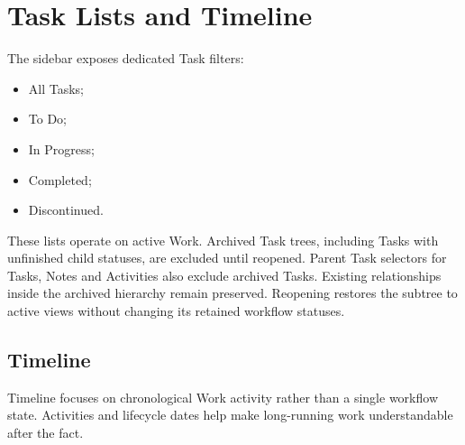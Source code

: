 \documentclass{testudomanual}
\begin{document}

\chapter{Task Lists and Timeline}

The sidebar exposes dedicated Task filters:
\begin{itemize}
    \item All Tasks;
    \item To Do;
    \item In Progress;
    \item Completed;
    \item Discontinued.
\end{itemize}

These lists operate on active Work. Archived Task trees, including Tasks with unfinished child statuses, are excluded until reopened. Parent Task selectors for Tasks, Notes and Activities also exclude archived Tasks. Existing relationships inside the archived hierarchy remain preserved. Reopening restores the subtree to active views without changing its retained workflow statuses.

\section{Timeline}

Timeline focuses on chronological Work activity rather than a single workflow state. Activities and lifecycle dates help make long-running work understandable after the fact.


\end{document}
